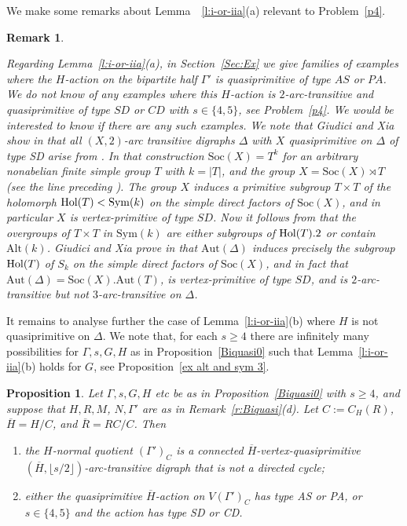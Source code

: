 \documentclass[11pt]{amsart}
\newtheorem{proposition}[theorem]{Proposition}
\newtheorem{remark}[theorem]{Remark}
\newcommand{\Soc}{\mathrm{Soc}}
\newcommand{\Aut}{\mathrm{Aut}}
\newcommand{\Sym}{\mathrm{Sym}}
\newcommand{\Alt}{\mathrm{Alt}}
\begin{document}
We make some remarks about Lemma~~\ref{l:i-or-iia}(a) relevant to Problem~\ref{p4}.

\begin{remark}\label{r:sd}
{\rm

Regarding Lemma~\ref{l:i-or-iia}(a), in Section~\ref{Sec:Ex}  we give families of examples where the $H$-action on the bipartite half $\Gamma'$ is quasiprimitive of type $AS$ or $PA$. We do not know of any examples  where this $H$-action is $2$-arc-transitive and quasiprimitive of type $SD$ or $CD$ with  $s\in\{4,5\}$, see Problem~\ref{p4}.  We would be interested to know if there are any such examples. We note that Giudici and Xia show in \cite[Theorem 1.2]{quasi} that all $(X,2)$-arc transitive digraphs $\Delta$ with $X$ quasiprimitive on $\Delta$ of type SD arise from \cite[Construction 3.1]{quasi}. In that construction $\Soc(X)=T^k$ for an arbitrary nonabelian finite simple group $T$  with $k=|T|$, and the group $X = \Soc(X)\rtimes T$ (see the line preceding \cite[Lemma 3.6]{quasi}). The group $X$ induces a primitive subgroup $T\times T$ of the holomorph ${\rm Hol}(T) < \Sym(k)$ on the simple direct factors of $\Soc(X)$, and in particular $X$ is vertex-primitive of type $SD$. Now it follows from \cite[Theorem, Section 3.4]{P90} that the  overgroups of $T\times T$ in $\Sym(k)$ are either subgroups of ${\rm Hol}(T).2$ or contain $\Alt(k)$. Giudici and Xia prove in \cite[Theorem 3.15]{quasi} that $\Aut(\Delta)$ induces precisely the subgroup ${\rm Hol}(T)$ of $S_k$ on the simple direct factors of $\Soc(X)$, and in fact that $\Aut(\Delta) = \Soc(X). \Aut(T)$, is vertex-primitive of type $SD$, and is $2$-arc-transitive but not $3$-arc-transitive on $\Delta$.    

  }  
\end{remark}




It remains to analyse further the case of Lemma~\ref{l:i-or-iia}(b) where \(H\) is not quasiprimitive on \(\Delta\). We note that, for each $s\geq4$ there are infinitely many possibilities for $\Gamma, s, G, H$ as in Proposition~\ref{Biquasi0}  such that Lemma~\ref{l:i-or-iia}(b) holds for $G$, see Proposition~\ref{ex alt and sym 3}.

\begin{proposition}\label{Biquasi1}
    Let $\Gamma, s, G, H$ etc be as in Proposition~\ref{Biquasi0} with $s\geqslant4$, and suppose that $H, R, M$, $N, \Gamma'$ are as in Remark~\ref{r:Biquasi}(d). Let $C:=C_H(R)$, $\overline{H}=H/C$, and $\overline{R}=RC/C$. Then
    \begin{enumerate}
        \item[(a)] the $H$-normal quotient $(\Gamma')_C$ is a connected  $\overline{H}$-vertex-quasiprimitive $(\overline{H}, \lfloor s/2\rfloor)$-arc-transit\-ive digraph that is not a directed cycle;
        \item[(b)] either the quasiprimitive $\overline{H}$-action on $V(\Gamma')_C$ has type AS or PA, or $s\in\{4,5\}$ and the action has type SD or CD. 
    \end{enumerate}    
\end{proposition}
\end{document}
